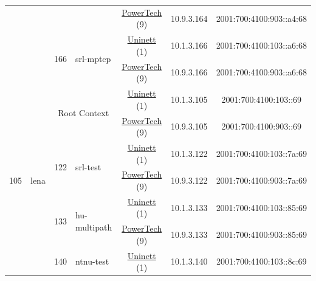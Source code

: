 \begin{small}
\begin{center}
\begin{longtable}{|c|c|c|c|c|c|c|c|}
  &  &  &  & \multicolumn{2}{|c|}{\tiny{\href{http://www.powertech.no}{PowerTech} (9)}} & \tiny{10.9.3.164} & \tiny{2001:700:4100:903::a4:68} \\* \cline{3-3}\cline{4-4}\cline{5-5}\cline{6-6}\cline{7-7}\cline{8-8}
  &  & \multirow{2}{*}{\tiny{166}} & \multicolumn{1}{|l|}{\multirow{2}{*}{\tiny{srl-mptcp}}} & \multicolumn{2}{|c|}{\tiny{\href{https://www.uninett.no}{Uninett} (1)}} & \tiny{10.1.3.166} & \tiny{2001:700:4100:103::a6:68} \\* \cline{5-5}\cline{6-6}\cline{7-7}\cline{8-8}
  &  &  &  & \multicolumn{2}{|c|}{\tiny{\href{http://www.powertech.no}{PowerTech} (9)}} & \tiny{10.9.3.166} & \tiny{2001:700:4100:903::a6:68} \\ \hline
 \multirow{14}{*}{\tiny{105}} & \multicolumn{1}{|l|}{\multirow{14}{*}{\tiny{lena}}} & \multicolumn{2}{|c|}{\multirow{2}{*}{\tiny{Root Context}}} & \multicolumn{2}{|c|}{\tiny{\href{https://www.uninett.no}{Uninett} (1)}} & \tiny{10.1.3.105} & \tiny{2001:700:4100:103::69} \\* \cline{5-5}\cline{6-6}\cline{7-7}\cline{8-8}
  &  & \multicolumn{2}{|c|}{} & \multicolumn{2}{|c|}{\tiny{\href{http://www.powertech.no}{PowerTech} (9)}} & \tiny{10.9.3.105} & \tiny{2001:700:4100:903::69} \\* \cline{3-3}\cline{4-4}\cline{5-5}\cline{6-6}\cline{7-7}\cline{8-8}
  &  & \multirow{2}{*}{\tiny{122}} & \multicolumn{1}{|l|}{\multirow{2}{*}{\tiny{srl-test}}} & \multicolumn{2}{|c|}{\tiny{\href{https://www.uninett.no}{Uninett} (1)}} & \tiny{10.1.3.122} & \tiny{2001:700:4100:103::7a:69} \\* \cline{5-5}\cline{6-6}\cline{7-7}\cline{8-8}
  &  &  &  & \multicolumn{2}{|c|}{\tiny{\href{http://www.powertech.no}{PowerTech} (9)}} & \tiny{10.9.3.122} & \tiny{2001:700:4100:903::7a:69} \\* \cline{3-3}\cline{4-4}\cline{5-5}\cline{6-6}\cline{7-7}\cline{8-8}
  &  & \multirow{2}{*}{\tiny{133}} & \multicolumn{1}{|l|}{\multirow{2}{*}{\tiny{hu-multipath}}} & \multicolumn{2}{|c|}{\tiny{\href{https://www.uninett.no}{Uninett} (1)}} & \tiny{10.1.3.133} & \tiny{2001:700:4100:103::85:69} \\* \cline{5-5}\cline{6-6}\cline{7-7}\cline{8-8}
  &  &  &  & \multicolumn{2}{|c|}{\tiny{\href{http://www.powertech.no}{PowerTech} (9)}} & \tiny{10.9.3.133} & \tiny{2001:700:4100:903::85:69} \\* \cline{3-3}\cline{4-4}\cline{5-5}\cline{6-6}\cline{7-7}\cline{8-8}
  &  & \multirow{2}{*}{\tiny{140}} & \multicolumn{1}{|l|}{\multirow{2}{*}{\tiny{ntnu-test}}} & \multicolumn{2}{|c|}{\tiny{\href{https://www.uninett.no}{Uninett} (1)}} & \tiny{10.1.3.140} & \tiny{2001:700:4100:103::8c:69} \\* \cline{5-5}\cline{6-6}\cline{7-7}\cline{8-8}

\end{longtable}
\end{center}
\end{small}
